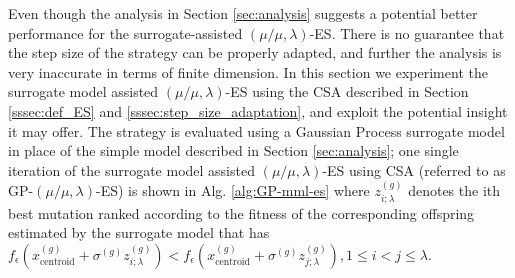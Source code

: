 
		



Even though the analysis in Section \ref{sec:analysis} suggests a potential better performance for the surrogate-assisted $(\mu/\mu,\lambda)$-ES. There is no guarantee that the step size of the strategy can be properly adapted, and further the analysis is very inaccurate in terms of finite dimension. In this section we experiment the surrogate model assisted $(\mu/\mu,\lambda)$-ES using the CSA described in Section \ref{sssec:def_ES} and \ref{sssec:step_size_adaptation}, and exploit the potential insight it may offer. The strategy is evaluated using a Gaussian Process surrogate model in place of the simple model described in Section \ref{sec:analysis}; one single iteration of the surrogate model assisted $(\mu/\mu,\lambda)$-ES using CSA (referred to as GP-$(\mu/\mu,\lambda)$-ES) is shown in Alg. \ref{alg:GP-mml-es} where $z_{i;\lambda}^{(g)}$ denotes the ith best mutation ranked according to the fitness of the corresponding offspring estimated by the surrogate model that has $f_{\epsilon}(x_{\text{centroid}}^{(g)} + \sigma^{(g)} z_{i;\lambda}^{(g)})<f_{\epsilon}(x_{\text{centroid}}^{(g)} + \sigma^{(g)} z_{j;\lambda}^{(g)}),1 \leq i < j \leq \lambda$. 

